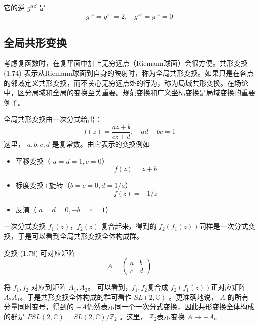 它的逆 $g^{\alpha\beta}$ 是
\begin{equation}
	g^{z \bar{z}}=g^{\bar{z} z}=2, \quad g^{z z}=g^{\bar{z} \bar{z}}=0
\end{equation}

\subsection{全局共形变换}

考虑复函数时，在复平面中加上无穷远点（Riemann球面）会很方便。共形变换 (1.74) 表示从Riemann球面到自身的映射时，称为全局共形变换。如果只是在各点的邻域定义共形变换，而不关心无穷远点处的行为，称为局域共形变换。在场论中，区分局域和全局的变换至关重要。规范变换和广义坐标变换是局域变换的重要例子。

全局共形变换由一次分式给出：
\begin{equation}
f(z)=\frac{a z+b}{c z+d}, \quad a d-b c=1
\end{equation}
这里， $a,b,c,d$ 是复常数。由它表示的变换例如
\begin{itemize}
	\item 平移变换（ $a=d=1 , c=0 $）
	\[f(z)=z+b\]
	\item 标度变换+旋转（$ b=c=0 , d=1/a $）
	\[ f(z)=-1/z\]
	\item 反演（ $a=d=0 , -b=c=1 $）
\end{itemize}

一次分式变换 $f_1(z) $，$ f_2(z)$ 复合起来，得到的 $f_2(f_1(z)) $同样是一次分式变换，于是可以看到全局共形变换全体构成群。

变换 (1.78) 可对应矩阵
\begin{equation}
	A=\left(\begin{array}{ll} a & b \\ c & d \end{array}\right)
\end{equation}

将 $f_1,f_2$ 对应到矩阵 $A_1,A_2 $。 可以看到，$f_1,f_2 $复合成 $f_2(f_1(z)) $正对应矩阵 $A_2A_1 $。于是共形变换全体构成的群可看作 $SL(2,\mathbb{C})$ 。更准确地说， $A$ 的所有分量同时变号，得到的 $-A $仍然表示同一个一次分式变换，因此共形变换全体构成的群是 $PSL(2,\mathbb{C})=SL(2,\mathbb{C})/\mathbb{Z}_2$ 。这里， $\mathbb{Z}_2 $表示变换 $A\to -A $。

